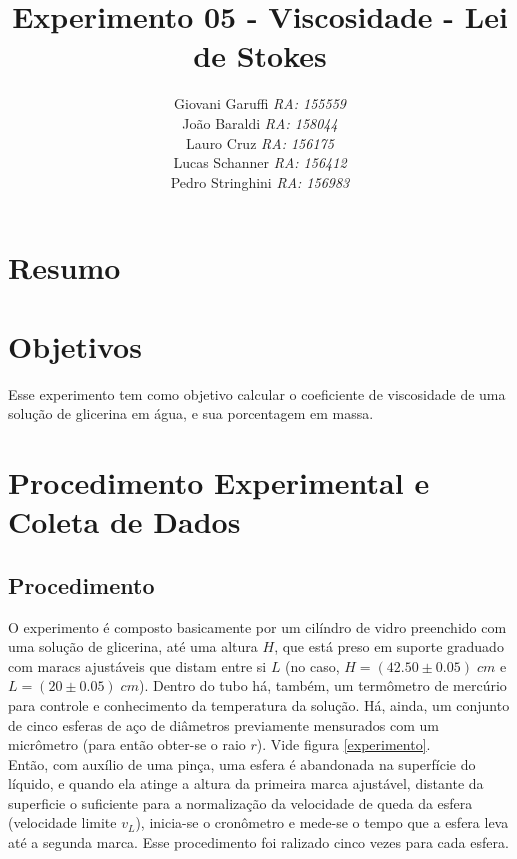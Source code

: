 \documentclass[12pt,a4paper]{article}
\begin{document}
\title{\vspace{70mm}\Huge Experimento 05 - Viscosidade - Lei de Stokes}
\author{ Giovani Garuffi\qquad\hfill
		\textit {RA: 155559}\protect\\
		João Baraldi\hfill
		\textit{RA: 158044}\protect\\
		Lauro Cruz\hfill
		\textit{RA: 156175}\protect\\
		Lucas Schanner\hfill
		\textit{RA: 156412}\protect\\
		Pedro Stringhini\hfill
		\textit {RA: 156983}								
		}
\maketitle
\newpage
\section{Resumo}


\section{Objetivos}
Esse experimento tem como objetivo calcular o coeficiente de viscosidade de uma solução de glicerina em água, e sua porcentagem em massa.


\section{Procedimento Experimental e Coleta de Dados}


\subsection{Procedimento}

O experimento é composto basicamente por um cilíndro de vidro preenchido com uma solução de glicerina, até uma altura $H$, que está preso em suporte graduado com maracs ajustáveis que distam entre si $L$ (no caso, $H = (42.50 \pm 0.05) \; cm$ e $L = (20 \pm 0.05) \; cm$). Dentro do tubo há, também, um termômetro de mercúrio para controle e conhecimento da temperatura da solução. Há, ainda, um conjunto de cinco esferas de aço de diâmetros previamente mensurados com um micrômetro (para então obter-se o raio $r$). Vide figura \ref{experimento}.\\

Então, com auxílio de uma pinça, uma esfera é abandonada na superfície do líquido, e quando ela atinge a altura da primeira marca ajustável, distante da superficie o suficiente para a normalização da velocidade de queda da esfera (velocidade limite $v_L$), inicia-se o cronômetro e mede-se o tempo que a esfera leva até a segunda marca. Esse procedimento foi ralizado cinco vezes para cada esfera.\\
\end{document}
